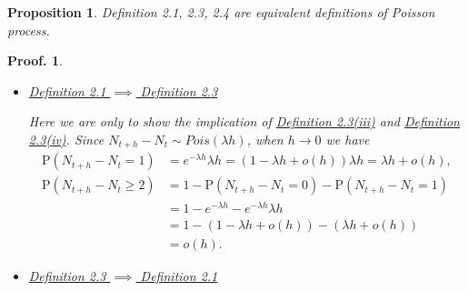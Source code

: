 \documentclass{article}
\newtheorem{proposition}{Proposition}[section]
\theoremstyle{nonumberplain}
\newtheorem{Proof}{Proof.}
\begin{document}
\begin{proposition}
	Definition 2.1, 2.3, 2.4 are equivalent definitions of Poisson process.
\end{proposition}
\begin{Proof}~\\
	\vspace{-1em}
	\begin{itemize}
	\item \underline{Definition 2.1 $\implies$ Definition 2.3} 
	
	Here we are only to show the implication of \hyperlink{Definition 2.3(iii)}{Definition 2.3(iii)} and \hyperlink{Definition 2.3(iv)}{Definition 2.3(iv)}. Since $N_{t+h}-N_t\sim Pois(\lambda h)$, when $h\to0$ we have 
	\begin{align*}
		\mathrm{P}(N_{t+h}-N_t=1)&=e^{-\lambda h}\lambda h=(1-\lambda h+o(h))\lambda h=\lambda h+o(h),\\
		\mathrm{P}(N_{t+h}-N_t\ge2)&=1-\mathrm{P}(N_{t+h}-N_t=0)-\mathrm{P}(N_{t+h}-N_t=1)\\
		&=1-e^{-\lambda h}-e^{-\lambda h}\lambda h\\
		&=1-(1-\lambda h+o(h))-(\lambda h+o(h))\\
		&=o(h).
	\end{align*}
	\item\underline{Definition 2.3 $\implies$ Definition 2.1} 
	

\end{itemize}
\end{Proof}
\end{document}
